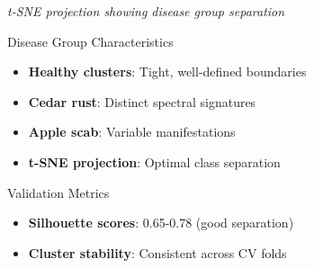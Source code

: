 \documentclass[aspectratio=43]{beamer}
\begin{document}
\begin{frame}
\begin{columns}
\begin{column}{0.5\textwidth}
\begin{center}
                \vspace{0.5cm}
                \textit{t-SNE projection showing disease group separation}
            \end{center}
            
            \begin{exampleblock}{Disease Group Characteristics}
                \begin{itemize}
                    \item \textbf{Healthy clusters}: Tight, well-defined boundaries
                    \item \textbf{Cedar rust}: Distinct spectral signatures
                    \item \textbf{Apple scab}: Variable manifestations
                    \item \textbf{t-SNE projection}: Optimal class separation
                \end{itemize}
            \end{exampleblock}
            
            \begin{block}{Validation Metrics}
                \begin{itemize}
                    \item \textbf{Silhouette scores}: 0.65-0.78 (good separation)
                    \item \textbf{Cluster stability}: Consistent across CV folds
                \end{itemize}
            \end{block}
        \end{column}
    \end{columns}
\end{frame}
\end{document}

